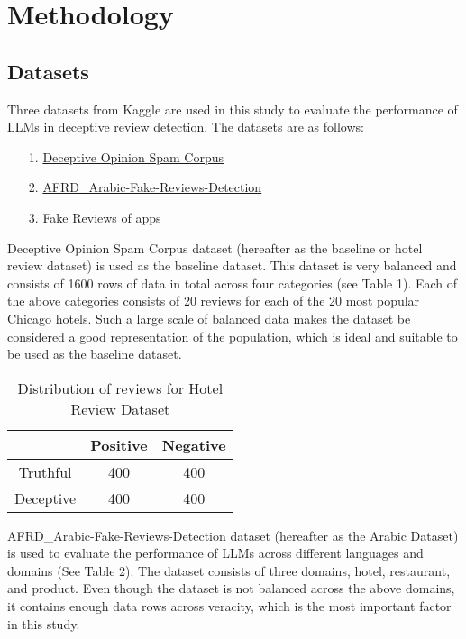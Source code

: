 \documentclass[sigconf, nonacm]{acmart}
\theoremstyle{definition}
\begin{document}
\section{Methodology}

\subsection{Datasets}
Three datasets from Kaggle are used in this study to evaluate the performance of LLMs in deceptive review detection. The datasets are as follows:

\begin{itemize}
  \item[1.] \href{https://www.kaggle.com/datasets/rtatman/deceptive-opinion-spam-corpus}{Deceptive Opinion Spam Corpus} \cite{ott-etal-2011-finding, ott-etal-2013-negative}
  \item[2.] \href{https://www.kaggle.com/datasets/shathaalturke/afrd-arabic-fake-reviews-detection}{AFRD\_Arabic-Fake-Reviews-Detection}
  \item[3.] \href{https://www.kaggle.com/datasets/umairanjacks/fake-reviews-of-apps}{Fake Reviews of apps}
\end{itemize}

Deceptive Opinion Spam Corpus dataset (hereafter as the baseline or hotel review dataset) is used as the baseline dataset. This dataset is very balanced and consists of 1600 rows of data in total across four categories (see Table 1). Each of the above categories consists of 20 reviews for each of the 20 most popular Chicago hotels. Such a large scale of balanced data makes the dataset be considered a good representation of the population, which is ideal and suitable to be used as the baseline dataset.

\begin{table}[h!]
  \centering
  \caption{Distribution of reviews for Hotel Review Dataset}
  \begin{tabular}{c c c}
    \toprule
              & Positive & Negative \\
    \midrule
    Truthful  & 400      & 400      \\
    Deceptive & 400      & 400      \\
    \bottomrule
  \end{tabular}
\end{table}

AFRD\_Arabic-Fake-Reviews-Detection dataset (hereafter as the Arabic Dataset) is used to evaluate the performance of LLMs across different languages and domains (See Table 2). The dataset consists of three domains, hotel, restaurant, and product. Even though the dataset is not balanced across the above domains, it contains enough data rows across veracity, which is the most important factor in this study.
\end{document}

